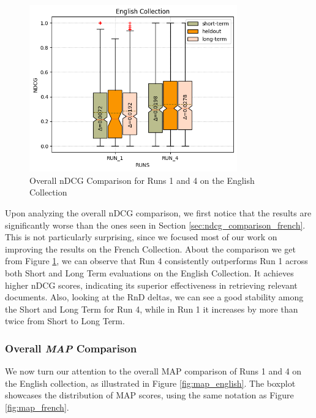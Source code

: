 \begin{figure}[!h]
\centering
\includegraphics[width=0.8\textwidth]{figure/StatisticalAnalysis/BoxPlot/NDGC ENGLISH.png}
\caption{Overall nDCG Comparison for Runs 1 and 4 on the English Collection}
\label{fig:overall_ndcg_eng}
\end{figure}
 
Upon analyzing the overall \ac{nDCG} comparison, we first notice that the results are significantly worse than the ones seen in Section \ref{sec:ndcg_comparison_french}. 
This is not particularly surprising, since we focused most of our work on improving the results on the French Collection.  
About the comparison we get from Figure \ref{fig:overall_ndcg_eng}, we can observe that Run 4 consistently outperforms Run 1 across both Short and Long Term evaluations on the English Collection. 
It achieves higher \ac{nDCG} scores, indicating its superior effectiveness in retrieving relevant documents. 
Also, looking at the \ac{RnD} deltas, we can see a good stability among the Short and Long Term for Run 4, while in Run 1 it increases by more than twice from Short to Long Term.

\subsubsection{Overall \textit{MAP} Comparison}

We now turn our attention to the overall \ac{MAP} comparison of Runs 1 and 4 on the English collection, as illustrated in Figure \ref{fig:map_english}. 
The boxplot showcases the distribution of \ac{MAP} scores, using the same notation as Figure \ref{fig:map_french}.

